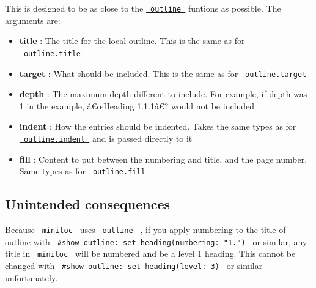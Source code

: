 \begin{Shaded}
\begin{Highlighting}[]
\end{Highlighting}
\end{Shaded}

This is designed to be as close to the
\href{https://typst.app/docs/reference/meta/outline/}{\texttt{\ outline\ }}
funtions as possible. The arguments are:

\begin{itemize}
\tightlist
\item
  \textbf{title} : The title for the local outline. This is the same as
  for
  \href{https://typst.app/docs/reference/meta/outline/\#parameters-title}{\texttt{\ outline.title\ }}
  .
\item
  \textbf{target} : What should be included. This is the same as for
  \href{https://typst.app/docs/reference/meta/outline/\#parameters-target}{\texttt{\ outline.target\ }}
\item
  \textbf{depth} : The maximum depth different to include. For example,
  if depth was 1 in the example, â€œHeading 1.1.1â€? would not be
  included
\item
  \textbf{indent} : How the entries should be indented. Takes the same
  types as for
  \href{https://typst.app/docs/reference/meta/outline/\#parameters-indent}{\texttt{\ outline.indent\ }}
  and is passed directly to it
\item
  \textbf{fill} : Content to put between the numbering and title, and
  the page number. Same types as for
  \href{https://typst.app/docs/reference/meta/outline/\#parameters-fill}{\texttt{\ outline.fill\ }}
\end{itemize}

\subsection{Unintended consequences}\label{unintended-consequences}

Because \texttt{\ minitoc\ } uses \texttt{\ outline\ } , if you apply
numbering to the title of outline with
\texttt{\ \#show\ outline:\ set\ heading(numbering:\ "1.")\ } or
similar, any title in \texttt{\ minitoc\ } will be numbered and be a
level 1 heading. This cannot be changed with
\texttt{\ \#show\ outline:\ set\ heading(level:\ 3)\ } or similar
unfortunately.

